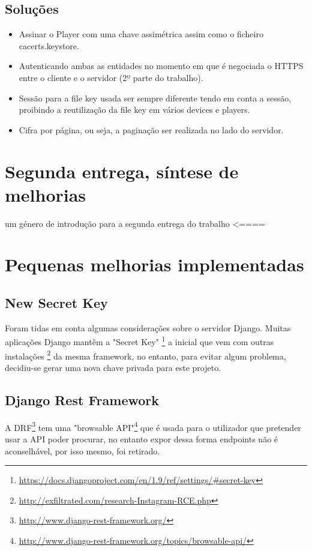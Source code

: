 \documentclass[pdftex,12pt,a4paper]{report}
\begin{document}
\subsection{Soluções}

\begin{itemize}
\item Assinar o Player com uma chave assimétrica assim como o ficheiro cacerts.keystore.
\item Autenticando ambas as entidades no momento em que é negociada o HTTPS entre o cliente e o servidor (2º parte do trabalho).
\item Sessão para a file key usada ser sempre diferente tendo em conta a sessão, proibindo a reutilização da file key em vários devices e players.
\item Cifra por página, ou seja, a paginação ser realizada no lado do servidor.
\end{itemize}

\newpage

\section{Segunda entrega, síntese de melhorias}

um género de introdução para a segunda entrega do trabalho <====

\section{Pequenas melhorias implementadas}

\subsection{New Secret Key}
Foram tidas em conta algumas considerações sobre o servidor Django. Muitas aplicações Django mantêm a "Secret Key" \footnote{\label{url1} \url{https://docs.djangoproject.com/en/1.9/ref/settings/\#secret-key}} a inicial que vem com outras instalações \footnote{\label{url1} \url{http://exfiltrated.com/research-Instagram-RCE.php}} da mesma framework, no entanto, para evitar algum problema, decidiu-se gerar uma nova chave privada para este projeto. 

\subsection{Django Rest Framework}
A DRF\footnote{\label{url1} \url{http://www.django-rest-framework.org/}} tem uma "browsable API"\footnote{\label{url1} \url{http://www.django-rest-framework.org/topics/browsable-api/}} que é usada para o utilizador que pretender  usar a API poder procurar, no entanto expor dessa forma endpoints não é aconselhável, por isso mesmo, foi retirado.
\end{document}
